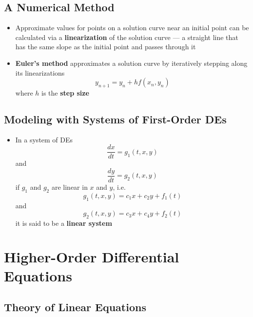 \documentclass{article}
\begin{document}
\subsection{A Numerical Method}

\begin{itemize}
  \item Approximate values for points on a solution curve near an initial point can be calculated via a \textbf{linearization} of the solution curve — a straight line that has the same slope as the initial point and passes through it

  \item \textbf{Euler's method} approximates a solution curve by iteratively stepping along its linearizations \[y_{n + 1} = y_n + h f(x_n, y_n)\] where $h$ is the \textbf{step size}
\end{itemize}

\setcounter{subsection}{8}
\subsection{Modeling with Systems of First-Order DEs}

\begin{itemize}
  \item In a system of DEs \[\frac{dx}{dt} = g_1(t, x, y)\] and \[\frac{dy}{dt} = g_2(t, x, y)\] if $g_1$ and $g_2$ are linear in $x$ and $y$, i.e. \[g_1(t, x, y) = c_1 x + c_2 y + f_1(t)\] and \[g_2(t, x, y) = c_3 x + c_4 y + f_2(t)\] it is said to be a \textbf{linear system}
\end{itemize}

\section{Higher-Order Differential Equations}

\subsection{Theory of Linear Equations}
\end{document}
